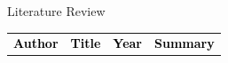 \begin{frame}{Literature Review}
	\begin{center}

		\begin{table}
			\centering
			\tiny
			\begin{tabular}{|p{1.4cm}|p{}|c|p{6cm}|}
				\hline
				\rowcolor{yellow} %

				\textcolor{black}{\textbf{Author}}         & \textcolor{black}{\textbf{Title}}                                                                       & \textcolor{black}{\textbf{Year}} & \textcolor{black}{\textbf{Summary}}                                                                                                                                                                                                                                                                                                                                               \\


\end{tabular}
\end{table}
\end{center}
\end{frame}
